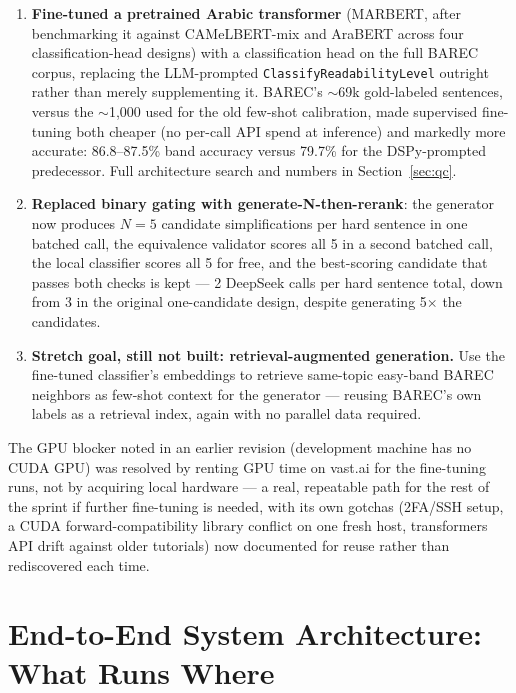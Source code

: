 \documentclass[11pt,a4paper]{article}
\begin{document}
\begin{enumerate}[leftmargin=1.6em]
  \item \textbf{Fine-tuned a pretrained Arabic transformer} (MARBERT, after
  benchmarking it against CAMeLBERT-mix and AraBERT across four
  classification-head designs) with a classification head on the full
  BAREC corpus, replacing the LLM-prompted \texttt{ClassifyReadabilityLevel}
  outright rather than merely supplementing it. BAREC's $\sim$69k
  gold-labeled sentences, versus the $\sim$1,000 used for the old few-shot
  calibration, made supervised fine-tuning both cheaper (no per-call API
  spend at inference) and markedly more accurate: 86.8--87.5\% band
  accuracy versus 79.7\% for the DSPy-prompted predecessor. Full
  architecture search and numbers in Section~\ref{sec:qc}.
  \item \textbf{Replaced binary gating with generate-N-then-rerank}: the
  generator now produces $N=5$ candidate simplifications per hard sentence
  in one batched call, the equivalence validator scores all 5 in a second
  batched call, the local classifier scores all 5 for free, and the
  best-scoring candidate that passes both checks is kept --- 2 DeepSeek
  calls per hard sentence total, down from 3 in the original one-candidate
  design, despite generating 5$\times$ the candidates.
  \item \textbf{Stretch goal, still not built: retrieval-augmented
  generation.} Use the fine-tuned classifier's embeddings to retrieve
  same-topic easy-band BAREC neighbors as few-shot context for the
  generator --- reusing BAREC's own labels as a retrieval index, again with
  no parallel data required.
\end{enumerate}

The GPU blocker noted in an earlier revision (development machine has no
CUDA GPU) was resolved by renting GPU time on vast.ai for the fine-tuning
runs, not by acquiring local hardware --- a real, repeatable path for the
rest of the sprint if further fine-tuning is needed, with its own gotchas
(2FA/SSH setup, a CUDA forward-compatibility library conflict on one fresh
host, transformers API drift against older tutorials) now documented for
reuse rather than rediscovered each time.

\newpage
\section{End-to-End System Architecture: What Runs Where}
\end{document}

